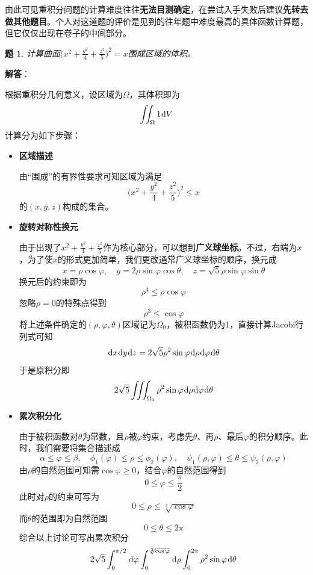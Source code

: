 \documentclass[a4paper,UTF8,fontset=windows,AutoFakeBold]{ctexart}
\newcommand*{\dr}{\hspace{0.07em}\mathrm{d}}
\newcommand*{\note}{\noindent *}
\theoremstyle{ex}
\newtheorem{exercise}{题}
\newcommand{\sol}[1]{{\vspace{5pt}\kaishu\noindent\textbf{解答}：\vspace{-3pt}
\begin{compactitem}
    \item[] #1
\end{compactitem}
}}
\begin{document}
\note 由此可见重积分问题的计算难度往往\textbf{无法目测确定}，在尝试入手失败后建议\textbf{先转去做其他题目}。个人对这道题的评价是见到的往年题中难度最高的具体函数计算题，但它仅仅出现在卷子的中间部分。

\begin{framed}
\begin{exercise}
    计算曲面$\big(x^2+\frac{y^2}{4}+\frac{z^2}{5}\big)^2=x$围成区域的体积。
\end{exercise}
\sol{
    根据重积分几何意义，设区域为$\Omega$，其体积即为
    $$\iint_\Omega1\dr V$$
    计算分为如下步骤：
    \begin{itemize}
        \item \textbf{区域描述}
        
        由``围成''的有界性要求可知区域为满足
        $$\bigg(x^2+\frac{y^2}{4}+\frac{z^2}{5}\bigg)^2\le x$$
        的$(x,y,z)$构成的集合。
        
        \item \textbf{旋转对称性换元}
        
        由于出现了$x^2+\frac{y^2}{4}+\frac{z^2}{5}$作为核心部分，可以想到\textbf{广义球坐标}。不过，右端为$x$，为了使$x$的形式更加简单，我们更改通常广义球坐标的顺序，换元成
        $$x=\rho\cos\varphi,\quad y=2\rho\sin\varphi\cos\theta,\quad z=\sqrt5\rho\sin\varphi\sin\theta$$
        换元后的约束即为
        $$\rho^4\le\rho\cos\varphi$$
        忽略$\rho=0$的特殊点得到
        $$\rho^3\le\cos\varphi$$
        将上述条件确定的$(\rho,\varphi,\theta)$区域记为$\Omega_0$，被积函数仍为1，直接计算Jacobi行列式可知
        $$\dr x\dr y\dr z=2\sqrt5\rho^2\sin\varphi\dr\rho\dr\varphi\dr\theta$$
        于是原积分即
        $$2\sqrt5\iiint_{\Omega_0}\rho^2\sin\varphi\dr\rho\dr\varphi\dr\theta$$

        \item \textbf{累次积分化}
        
        由于被积函数对$\theta$为常数，且$\rho$被$\varphi$约束，考虑先$\theta$、再$\rho$、最后$\varphi$的积分顺序。此时，我们需要将集合描述成
        $$\alpha\le\varphi\le\beta,\quad\phi_1(\varphi)\le\rho\le\phi_2(\varphi),\quad\psi_1(\rho,\varphi)\le\theta\le\psi_2(\rho,\varphi)$$
        由$\rho$的自然范围可知需$\cos\varphi\ge0$，结合$\varphi$的自然范围得到
        $$0\le\varphi\le\frac{\pi}{2}$$
        此时对$\rho$的约束可写为
        $$0\le\rho\le\sqrt[3]{\cos\varphi}$$
        而$\theta$的范围即为自然范围
        $$0\le\theta\le2\pi$$
        综合以上讨论可写出累次积分
        $$2\sqrt5\int_0^{\pi/2}\dr\varphi\int_0^{\sqrt[3]{\cos\varphi}}\dr\rho\int_0^{2\pi}\rho^2\sin\varphi\dr\theta$$


\end{itemize}}
\end{framed}
\end{document}
